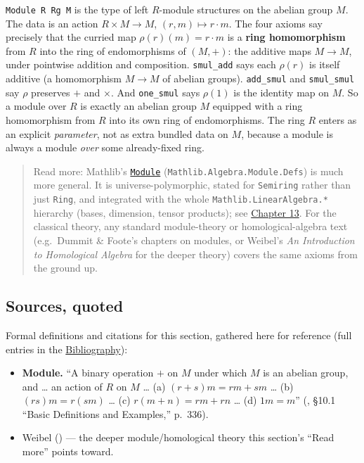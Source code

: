 \begin{mathreading}

\texttt{Module R Rg M} is the type of left \(R\)-module structures on the abelian group \(M\). The data is an action \(R \times M \to
M\), \((r,m)\mapsto r\cdot m\). The four axioms say precisely that the curried map \(\rho(r)(m) = r\cdot m\) is a \textbf{ring homomorphism} from \(R\) into the ring of endomorphisms of \((M,+)\): the additive maps \(M \to M\), under pointwise addition and composition. \texttt{smul\_\allowbreak{}add} says each \(\rho(r)\) is itself additive (a homomorphism \(M \to M\) of abelian groups). \texttt{add\_\allowbreak{}smul} and \texttt{smul\_\allowbreak{}smul} say \(\rho\) preserves \(+\) and \(\times\). And \texttt{one\_\allowbreak{}smul} says \(\rho(1)\) is the identity map on \(M\). So a module over \(R\) is exactly an abelian group \(M\) equipped with a ring homomorphism from \(R\) into its own ring of endomorphisms. The ring \(R\) enters as an explicit \emph{parameter}, not as extra bundled data on \(M\), because a module is always a module \emph{over} some already-fixed ring.

\end{mathreading}

\begin{quote}
Read more: Mathlib's \href{https://loogle.lean-lang.org/?q=Module}{\texttt{Module}} (\texttt{Mathlib.Algebra.Module.Defs}) is much more general. It is universe-polymorphic, stated for \texttt{Semiring} rather than just \texttt{Ring}, and integrated with the whole \texttt{Mathlib.LinearAlgebra.*} hierarchy (bases, dimension, tensor products); see \hyperref[sec:13-next-steps:02-moving-to-mathlib:1]{Chapter 13}. For the classical theory, any standard module-theory or homological-algebra text (e.g.~Dummit \& Foote's chapters on modules, or Weibel's \emph{An Introduction to Homological Algebra} for the deeper theory) covers the same axioms from the ground up.
\end{quote}

\subsection{Sources, quoted}\label{sec:10-modules:02-translating-into-lean:2}

Formal definitions and citations for this section, gathered here for reference (full entries in the \hyperref[sec:root:bibliography:1]{Bibliography}):

\begin{itemize}
\tightlist
\item
  \textbf{Module.} ``A binary operation \(+\) on \(M\) under which \(M\) is an abelian group, and \ldots{} an action of \(R\) on \(M\) \ldots{} (a) \((r+s)m = rm+sm\) \ldots{} (b) \((rs)m = r(sm)\) \ldots{} (c) \(r(m+n) = rm+rn\) \ldots{} (d) \(1m = m\)'' (\cite{DummitFoote2003}, §10.1 ``Basic Definitions and Examples,'' p.~336).
\item
  Weibel (\cite{Weibel1994}) --- the deeper module/homological theory this section's ``Read more'' points toward.
\end{itemize}
